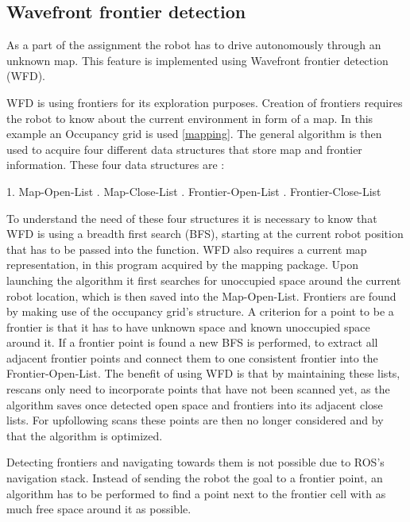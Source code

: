 \documentclass{ba-kecs}
\begin{document}
\subsection{Wavefront frontier detection}

As a part of the assignment the robot has to drive autonomously through an unknown map. This feature is implemented using Wavefront frontier detection (WFD).

WFD is using frontiers for its exploration purposes. Creation of frontiers requires the robot to know about the current environment in form of a map. In this example an Occupancy grid is used \ref{mapping}. The general algorithm is then used to acquire four different data structures that store map and frontier information. These four data structures are :

1. Map-Open-List
. Map-Close-List
. Frontier-Open-List
. Frontier-Close-List 
\newline
 
To understand the need of these four structures it is necessary to know that WFD is using a breadth first search (BFS), starting at the current robot position that has to be passed into the function. WFD also requires a current map representation, in this program acquired by the mapping package.
 Upon launching the algorithm it first searches for unoccupied space around the current robot location, which is then saved into the Map-Open-List. 
 Frontiers are found by making use of the occupancy grid's structure. A criterion for a point to be a frontier is that it has to have unknown space and known unoccupied space around it. If a frontier point is found a new BFS is performed, to extract all adjacent frontier points and connect them to one consistent frontier into the Frontier-Open-List.
 The benefit of using WFD is that by maintaining these lists, rescans only need to incorporate points that have not been scanned yet, as the algorithm saves once detected open space and frontiers into its adjacent close lists. For upfollowing scans these points are then no longer considered and by that the algorithm is optimized.
 
 Detecting frontiers and navigating towards them is not possible due to ROS's navigation stack. Instead of sending the robot the goal to a frontier point, an algorithm has to be performed to find a point next to the frontier cell with as much free space around it as possible. 
\end{document}
